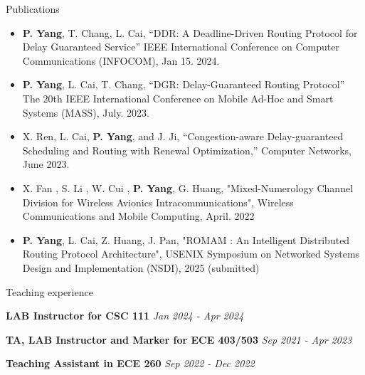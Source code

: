 \documentclass[]{puyang-resume}
\begin{document}

\begin{section}{Publications}
    \begin{itemize}
        \item \textbf{P. Yang}, T. Chang, L. Cai, “DDR: A Deadline-Driven Routing Protocol for Delay Guaranteed Service” IEEE International Conference on Computer Communications (INFOCOM), Jan 15. 2024.
        \item \textbf{P. Yang}, L. Cai, T. Chang, “DGR: Delay-Guaranteed Routing Protocol” The 20th IEEE International Conference on Mobile Ad-Hoc and Smart Systems (MASS), July. 2023.
        
        \item X. Ren, L. Cai, \textbf{P. Yang}, and J. Ji, “Congestion-aware Delay-guaranteed Scheduling and Routing with Renewal Optimization,” Computer Networks, June 2023.

        \item X. Fan , S. Li , W. Cui , \textbf{P. Yang}, G. Huang, "Mixed-Numerology Channel Division for Wireless Avionics Intracommunications", Wireless Communications and Mobile Computing, April. 2022

        \item \textbf{P. Yang}, L. Cai, Z. Huang, J. Pan, "ROMAM : An Intelligent Distributed Routing Protocol Architecture", USENIX Symposium on Networked Systems Design and Implementation (NSDI), 2025 (submitted)
    \end{itemize}
\end{section}

\begin{section}{Teaching experience}
    \item \textbf{LAB Instructor for CSC 111}
        \hfill \textit{Jan 2024 - Apr 2024}
    \item \textbf{TA, LAB Instructor and Marker for ECE 403/503}
        \hfill \textit{Sep 2021 - Apr 2023}
    \item \textbf{Teaching Assistant in ECE 260}
        \hfill \textit{Sep 2022 - Dec 2022}
\end{section}
\end{document}
